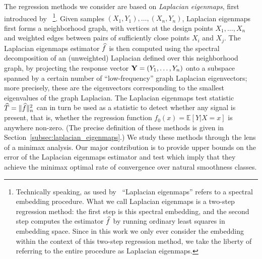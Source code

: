 The regression methods we consider are based on \emph{Laplacian eigenmaps}, first introduced by~\cite{belkin03a} \footnote{Technically speaking, as used by~\cite{belkin03a} ``Laplacian eigenmaps'' refers to a spectral embedding procedure. What we call Laplacian eigenmaps is a two-step regression method: the first step is this spectral embedding, and the second step computes the estimator $\widehat{f}$ by running ordinary least squares in embedding space.  Since in this work we only ever consider the embedding within the context of this two-step regression method, we take the liberty of referring to the entire procedure as Laplacian eigenmaps.}. Given samples $(X_1,Y_1),\ldots,(X_n,Y_n)$, Laplacian eigenmaps first forms a neighborhood graph, with vertices at the design points $X_1,\ldots,X_n$ and weighted edges between pairs of sufficiently close points $X_i$ and $X_j$. The Laplacian eigenmaps estimator $\widehat{f}$ is then computed using the spectral decomposition of an (unweighted) Laplacian defined over this neighborhood graph, by projecting the response vector ${\bf Y} = (Y_1,\ldots,Y_n)$ onto a subspace spanned by a certain number of ``low-frequency'' graph Laplacian eigenvectors; more precisely, these are the eigenvectors corresponding to the smallest eigenvalues of the graph Laplacian. The Laplacian eigenmaps test statistic $\widehat{T} = \|\widehat{f}\|_n^2$ can in turn be used as a statistic to detect whether any signal is present, that is, whether the regression function $f_0(x) = \mathbb{E}[Y|X = x]$ is anywhere non-zero. (The precise definition of these methods is given in Section~\ref{subsec:laplacian_eigenmaps}.) We study these methods through the lens of a minimax analysis. Our major contribution is to provide upper bounds on the error of the Laplacian eigenmaps estimator and test which imply that they achieve the minimax optimal rate of convergence over natural smoothness classes.

